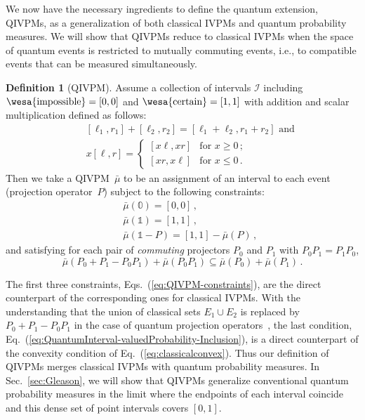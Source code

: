\documentclass[english,reprint, aps, prl,superscriptaddress, showpacs,
showkeys, longbibliography, amsmath, amssymb]{revtex4-1}
\theoremstyle{plain}
\theoremstyle{definition}
\newtheorem{definition}{Definition}
\newcommand{\imposs}{{\text{\wesa{impossible}}}}
\newcommand{\necess}{{\text{\wesa{certain}}}}
\begin{document}
We now have the necessary ingredients to define the quantum extension,
QIVPMs, as a generalization of both classical IVPMs and quantum
probability measures. We will show that QIVPMs reduce to classical
IVPMs when the space of quantum events is restricted to mutually
commuting events, i.e., to compatible events that can be measured
simultaneously.

\begin{definition}[QIVPM]
  Assume a collection of intervals $\mathscr{I}$ including
  $\imposs=[0,0]$ and $\necess=[1,1]$ with addition and scalar
  multiplication defined as follows:
  \begin{subequations}\label{eq:interval-operations}
  \begin{eqnarray}
   &  & [\ell_{1},r_{1}]+[\ell_{2},r_{2}]=[\ell_{1}+\ell_{2},r_{1}+r_{2}]\textrm{ and}\\
   &  & x[\ell,r]=\begin{cases}
  [x\ell,xr] & \textrm{for }x\ge0\,;\\{}
  [xr,x\ell] & \textrm{for }x\le0\,.
  \end{cases}
  \end{eqnarray}
  \end{subequations}
  Then we take a QIVPM~$\bar{\mu}$ to be an assignment of an interval to each
  event (projection operator~$P$) subject to the following constraints:
  \begin{subequations}\label{eq:QIVPM-constraints}
  \begin{eqnarray}
   &  & \bar{\mu}(\mathbb{0})=\left[0,0\right]\,,\\
   &  & \bar{\mu}(\mathbb{1})=\left[1,1\right]\,,\\
   &  & \bar{\mu}\left(\mathbb{1}-P\right)=\left[1,1\right]-\bar{\mu}\left(P\right)\,,
  \end{eqnarray}
  \end{subequations}
  and satisfying for each pair of \emph{commuting} projectors $P_0$
  and $P_1$ with $P_0P_1=P_1P_0$,
\begin{equation}
\bar{\mu}\left(P_{0}+P_{1}-P_{0}P_{1}\right)+\bar{\mu}\left(P_{0}P_{1}\right)\subseteq\bar{\mu}\left(P_{0}\right)+\bar{\mu}\left(P_{1}\right)\,.
\label{eq:QuantumInterval-valuedProbability-Inclusion}
\end{equation}
\end{definition}
\noindent The first three constraints,
Eqs.~(\ref{eq:QIVPM-constraints}), are the direct counterpart of the
corresponding ones for classical IVPMs.  With the understanding that
the union of classical sets $E_1\cup E_2$ is replaced by
$P_0+P_1-P_0P_1$ in the case of quantum projection
operators~\cite{Griffiths2003}, the last condition,
Eq.~(\ref{eq:QuantumInterval-valuedProbability-Inclusion}), is a
direct counterpart of the convexity condition of
Eq.~(\ref{eq:classicalconvex}). Thus our definition of QIVPMs merges
classical IVPMs with quantum probability measures. In
Sec.~\ref{sec:Gleason}, we will show that QIVPMs generalize
conventional quantum probability measures in the limit where the
endpoints of each interval coincide and this dense set of point
intervals covers $[0,1]$.
\end{document}
